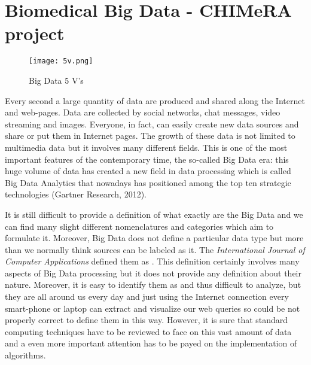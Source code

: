\documentclass{standalone}
\begin{document}
\chapter[Big Data]{Biomedical Big Data - CHIMeRA project}\label{chapter3:bigdata}

\begin{center}
\begin{figure}[htbp]
\centering
\texttt{[image: 5v.png]}
\caption{Big Data 5 V's}
\label{fig:5v}
\end{figure}
\end{center}

Every second a large quantity of data are produced and shared along the Internet and web-pages.
Data are collected by social networks, chat messages, video streaming and images.
Everyone, in fact, can easily create new data sources and share or put them in Internet pages.
The growth of these data is not limited to multimedia data but it involves many different fields.
This is one of the most important features of the contemporary time, the so-called Big Data era: this huge volume of data has created a new field in data processing which is called Big Data Analytics that nowadays has positioned among the top ten strategic technologies (Gartner Research, 2012).

It is still difficult to provide a definition of what exactly are the Big Data and we can find many slight different nomenclatures and categories which aim to formulate it.
Moreover, Big Data does not define a particular data type but more than we normally think sources can be labeled as it.
The \emph{International Journal of Computer Applications} defined them as .
This definition certainly involves many aspects of Big Data processing but it does not provide any definition about their nature.
Moreover, it is easy to identify them as  and thus difficult to analyze, but they are all around us every day and just using the Internet connection every smart-phone or laptop can extract and visualize our web queries so could be not properly correct to define them in this way.
However, it is sure that standard computing techniques have to be reviewed to face on this vast amount of data and a even more important attention has to be payed on the implementation of algorithms.
\end{document}
